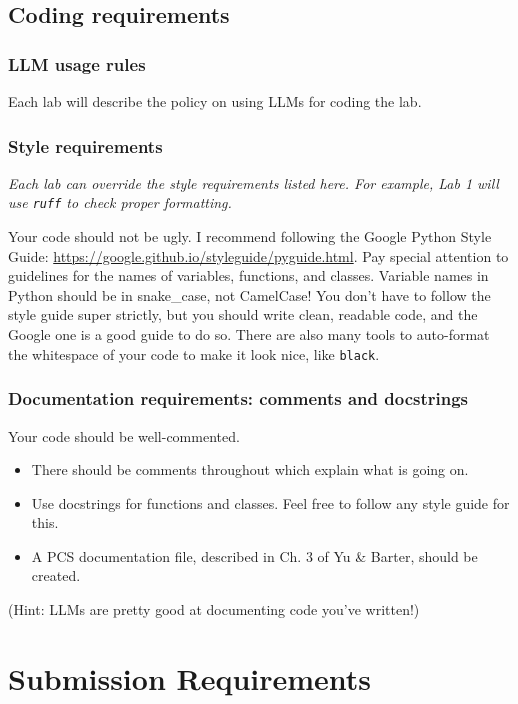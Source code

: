 \documentclass[letterpaper,12pt]{article}
\begin{document}
\subsection{Coding requirements}

\subsubsection{LLM usage rules}
Each lab will describe the policy on using LLMs for coding the lab.

\subsubsection{Style requirements}

\textit{Each lab can override the style requirements listed here. For example, Lab 1 will use \texttt{ruff} to check proper formatting.}

Your code should not be ugly. I recommend following the Google Python Style Guide: \url{https://google.github.io/styleguide/pyguide.html}. Pay special attention to guidelines for the names of variables, functions, and classes. Variable names in Python should be in snake\_case, not CamelCase! You don't have to follow the style guide super strictly, but you should write clean, readable code, and the Google one is a good guide to do so. There are also many tools to auto-format the whitespace of your code to make it look nice, like \texttt{black}.

\subsubsection{Documentation requirements: comments and docstrings}
Your code should be well-commented.
\begin{itemize}
  \item There should be comments throughout which explain what is going on.
  \item Use docstrings for functions and classes. Feel free to follow any style guide for this.
  \item A PCS documentation file, described in Ch. 3 of Yu \& Barter, should be created.
\end{itemize}
(Hint: LLMs are pretty good at documenting code you've written!)

\section{Submission Requirements}
\end{document}

